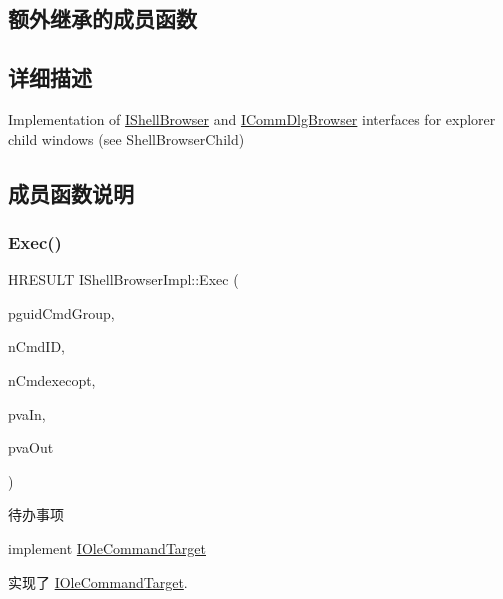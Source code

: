 \subsection*{额外继承的成员函数}


\subsection{详细描述}
Implementation of \hyperlink{interface_i_shell_browser}{I\+Shell\+Browser} and \hyperlink{interface_i_comm_dlg_browser}{I\+Comm\+Dlg\+Browser} interfaces for explorer child windows (see Shell\+Browser\+Child) 

\subsection{成员函数说明}
\mbox{\label{struct_i_shell_browser_impl_a031b9143340e0e0652e6985b8f0f5b75}} 
\subsubsection{\texorpdfstring{Exec()}{Exec()}}
{\footnotesize\ttfamily H\+R\+E\+S\+U\+LT I\+Shell\+Browser\+Impl\+::\+Exec (\begin{DoxyParamCaption}\item[{const \hyperlink{interface_g_u_i_d}{G\+U\+ID} $\ast$}]{pguid\+Cmd\+Group,  }\item[{D\+W\+O\+RD}]{n\+Cmd\+ID,  }\item[{D\+W\+O\+RD}]{n\+Cmdexecopt,  }\item[{\hyperlink{structtag_v_a_r_i_a_n_t}{V\+A\+R\+I\+A\+NT} $\ast$}]{pva\+In,  }\item[{\hyperlink{structtag_v_a_r_i_a_n_t}{V\+A\+R\+I\+A\+NT} $\ast$}]{pva\+Out }\end{DoxyParamCaption})\hspace{0.3cm}{\ttfamily [virtual]}}

\begin{DoxyRefDesc}{待办事项}
\item[\hyperlink{todo__todo000081}{待办事项}]implement \hyperlink{interface_i_ole_command_target}{I\+Ole\+Command\+Target} \end{DoxyRefDesc}


实现了 \hyperlink{interface_i_ole_command_target}{I\+Ole\+Command\+Target}.

